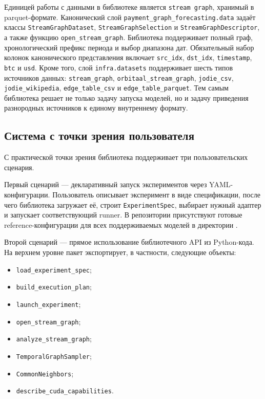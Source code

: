 \documentclass[a4paper,12pt]{extarticle}
\begin{document}
  Единицей работы с данными в библиотеке является \texttt{stream graph}, хранимый в parquet-формате. Канонический слой \texttt{payment\_graph\_forecasting.data}
  задаёт классы \texttt{StreamGraphDataset}, \texttt{StreamGraphSelection} и \texttt{StreamGraphDescriptor}, а также функцию \texttt{open\_stream\_graph}. Библиотека
  поддерживает полный граф, хронологический префикс периода и выбор диапазона дат. Обязательный набор колонок канонического представления включает \texttt{src\_idx},
  \texttt{dst\_idx}, \texttt{timestamp}, \texttt{btc} и \texttt{usd}. Кроме того, слой \texttt{infra.datasets} поддерживает шесть типов источников данных:
  \texttt{stream\_graph}, \texttt{orbitaal\_stream\_graph}, \texttt{jodie\_csv}, \texttt{jodie\_wikipedia}, \texttt{edge\_table\_csv} и
  \texttt{edge\_table\_parquet}. Тем самым библиотека решает не только задачу запуска моделей, но и задачу приведения разнородных источников к единому внутреннему
  формату.

  \subsection{Система с точки зрения пользователя}

  С практической точки зрения библиотека поддерживает три пользовательских сценария.

  Первый сценарий --- декларативный запуск экспериментов через YAML-конфигурации. Пользователь описывает эксперимент в виде спецификации, после чего библиотека
  загружает её, строит \texttt{ExperimentSpec}, выбирает нужный адаптер и запускает соответствующий runner. В репозитории присутствуют готовые reference-конфигурации
  для всех поддерживаемых моделей в директории .

  Второй сценарий --- прямое использование библиотечного API из Python-кода. На верхнем уровне пакет экспортирует, в частности, следующие объекты:
  \begin{itemize}
      \item \texttt{load\_experiment\_spec};
      \item \texttt{build\_execution\_plan};
      \item \texttt{launch\_experiment};
      \item \texttt{open\_stream\_graph};
      \item \texttt{analyze\_stream\_graph};
      \item \texttt{TemporalGraphSampler};
      \item \texttt{CommonNeighbors};
      \item \texttt{describe\_cuda\_capabilities}.
  \end{itemize}
\end{document}
